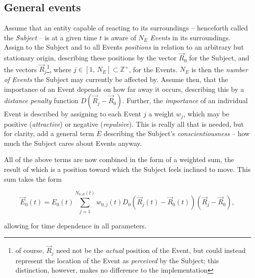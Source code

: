 \documentclass[]{article} %
\begin{document}
\subsection{General events}
\label{sec:general_events}
Assume that an entity capable of reacting to its surroundings -- henceforth called the \emph{Subject} -- is at a given time $t$ is aware of $N_E$ \emph{Events} in its surroundings.
Assign to the Subject and to all Events \emph{positions} in relation to an arbitrary but stationary origin, describing these positions by the vector $\vec{R}_0$ for the Subject, and the vectors $\vec{R}_j$\footnote{of course, $\vec{R}_j$ need not be the \emph{actual} position of the Event, but could instead represent the location of the Event as \emph{perceived} by the Subject; this distinction, however, makes no difference to the implementation}, 
where $j \in \left[1,\, N_E\right] \subset \mathbb{Z}^+$, for the Events.
$N_E$ is then the \emph{number of Events} the Subject may currently be affected by.
Assume then, that the importance of an Event depends on how far away it occurs, describing this by a \emph{distance penalty} function $D(\vec{R}_j -\vec{R}_0)$.
Further, the \emph{importance} of an individual Event is described by assigning to each Event $j$ a weight $w_j$, which may be positive (\emph{attractive}) or negative (\emph{repulsive}).
This is really all that is needed, but for clarity, add a general term $E$ describing the Subject's \emph{conscientiousness} -- how much the Subject cares about Events anyway.

All of the above terms are now combined in the form of a weighted sum, the result of which is a position toward which the Subject feels inclined to move. This sum takes the form

\begin{equation}
 \label{eq:events_raw}
 \vec{E}_0(t) = E_0(t)\sum_{j=1}^{N_{0,E}(t)} w_{0,j}(t) D_0(\vec{R}_j(t) - \vec{R}_0(t))(\vec{R}_j -\vec{R}_0),
\end{equation}

\noindent allowing for time dependence in all parameters. 
\end{document}

